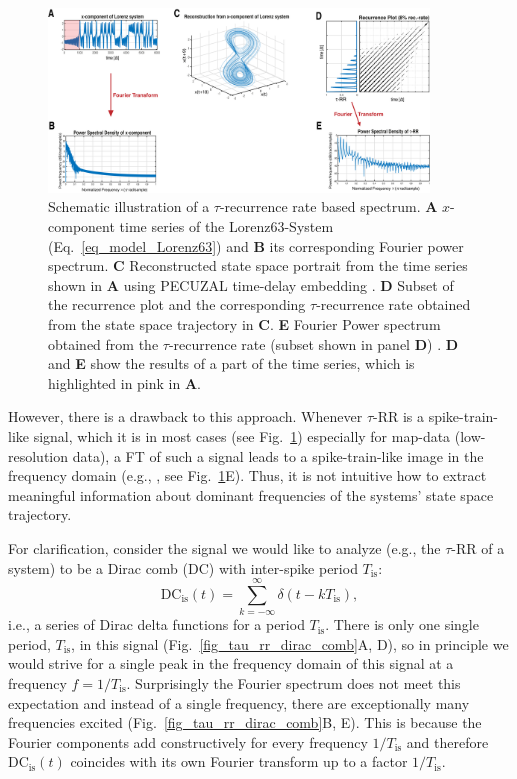 \documentclass[entropy,article,submit,pdftex,moreauthors]{Definitions/mdpi}
\begin{document}
\begin{figure}
 \centering
 \includegraphics[width=0.9\textwidth]{./figures/fig_tau_rr_spectrum_example}
 \caption{Schematic illustration of a $\tau$-recurrence rate based spectrum. \textbf{A} $x$-component time series of the Lorenz63-System (Eq.~\eqref{eq_model_Lorenz63}) and 
 \textbf{B} its corresponding Fourier power spectrum. 
 \textbf{C} Reconstructed state space portrait from the time series shown in \textbf{A} using PECUZAL time-delay embedding \cite{Kraemer2021}. 
 \textbf{D} Subset of the recurrence plot and the corresponding $\tau$-recurrence rate obtained from the state space trajectory in \textbf{C}. 
 \textbf{E} Fourier Power spectrum obtained from the $\tau$-recurrence rate (subset shown in panel \textbf{D}) \cite{Zbilut2008}. \textbf{D} and \textbf{E} show the results of a part of the time series, 
 which is highlighted in pink in \textbf{A}.
 }\label{fig_tau_rr_spectrum_example}
\end{figure}

However, there is a drawback to this approach. Whenever $\tau$-RR is a spike-train-like signal, which it is in most cases (see Fig.~\ref{fig_tau_rr_spectrum_example}) especially for 
map-data (low-resolution data), a FT of such a signal leads to a spike-train-like image in the frequency domain (e.g., \cite{Schild1982,Cordoba1989}, see 
Fig.~\ref{fig_tau_rr_spectrum_example}E). Thus, it is not intuitive how to extract meaningful information about dominant frequencies of the systems' state space trajectory. 

For clarification, consider the signal we would like to analyze 
(e.g., the $\tau$-RR of a system) to be a Dirac comb (DC) with inter-spike period $T_\text{is}$: 
\begin{equation}
\text{DC}_{\text{is}}(t) = \sum_{k=-\infty}^{\infty} \delta(t-kT_\text{is}),
\label{eq_dirac_comb}
\end{equation}
i.e., a series of Dirac delta functions for a period $T_\text{is}$. There is only one single period, $T_\text{is}$, in this signal (Fig.~\ref{fig_tau_rr_dirac_comb}A, D), so 
in principle we would strive for a single peak in the frequency domain of this signal at a frequency $f=1/T_\text{is}$. Surprisingly the Fourier spectrum does not meet this expectation 
and instead of a single frequency, there are exceptionally many frequencies excited (Fig.~\ref{fig_tau_rr_dirac_comb}B, E). This is because the Fourier components add constructively 
for every frequency $1/T_\text{is}$ and therefore $\text{DC}_{\text{is}}(t)$ coincides with its own Fourier transform up to a factor $1/T_\text{is}$.
\end{document}
